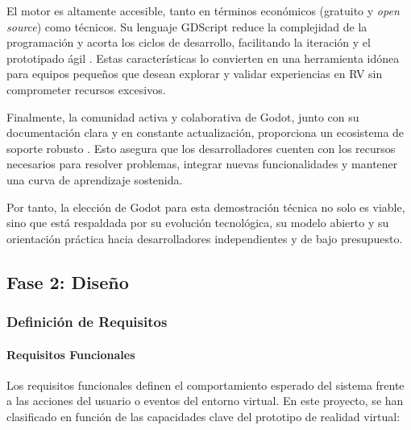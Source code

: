 \documentclass[journal,article,accept,pdftex,moreauthors]{Definitions/mdpi}
\begin{document}
El motor es altamente accesible, tanto en términos económicos (gratuito y \textit{open source}) como técnicos. Su lenguaje GDScript reduce la complejidad de la programación y acorta los ciclos de desarrollo, facilitando la iteración y el prototipado ágil \cite{godotDocs2024}. Estas características lo convierten en una herramienta idónea para equipos pequeños que desean explorar y validar experiencias en RV sin comprometer recursos excesivos.

Finalmente, la comunidad activa y colaborativa de Godot, junto con su documentación clara y en constante actualización, proporciona un ecosistema de soporte robusto \cite{godotCommunity2024}. Esto asegura que los desarrolladores cuenten con los recursos necesarios para resolver problemas, integrar nuevas funcionalidades y mantener una curva de aprendizaje sostenida.

Por tanto, la elección de Godot para esta demostración técnica no solo es viable, sino que está respaldada por su evolución tecnológica, su modelo abierto y su orientación práctica hacia desarrolladores independientes y de bajo presupuesto.


\subsection{Fase 2: Diseño}

\subsubsection{Definición de Requisitos}

\paragraph{Requisitos Funcionales}

Los requisitos funcionales definen el comportamiento esperado del sistema frente a las acciones del usuario o eventos del entorno virtual. En este proyecto, se han clasificado en función de las capacidades clave del prototipo de realidad virtual:
\end{document}
